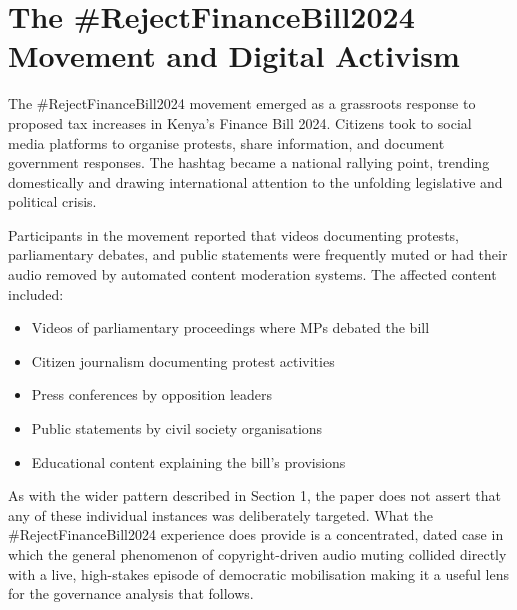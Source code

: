 \documentclass{article}
\begin{document}
\section{The \#RejectFinanceBill2024 Movement and Digital Activism}
\par 
The \#RejectFinanceBill2024 movement emerged as a grassroots response to proposed tax increases in Kenya’s Finance Bill 2024. Citizens took to social media platforms to organise protests, share information, and document government responses. The hashtag became a national rallying point, trending domestically and drawing international attention to the unfolding legislative and political crisis.
\par 
Participants in the movement reported that videos documenting protests, parliamentary debates, and public statements were frequently muted or had their audio removed by automated content moderation systems. The affected content included:
\begin{itemize}
\item Videos of parliamentary proceedings where MPs debated the bill
\item Citizen journalism documenting protest activities
\item Press conferences by opposition leaders
\item Public statements by civil society organisations
\item Educational content explaining the bill’s provisions
\end{itemize}
\par
As with the wider pattern described in Section 1, the paper does not assert that any of these individual instances was deliberately targeted. What the \#RejectFinanceBill2024 experience does provide is a concentrated, dated case in which the general phenomenon of copyright-driven audio muting collided directly with a live, high-stakes episode of democratic mobilisation making it a useful lens for the governance analysis that follows.
\par
\end{document}
